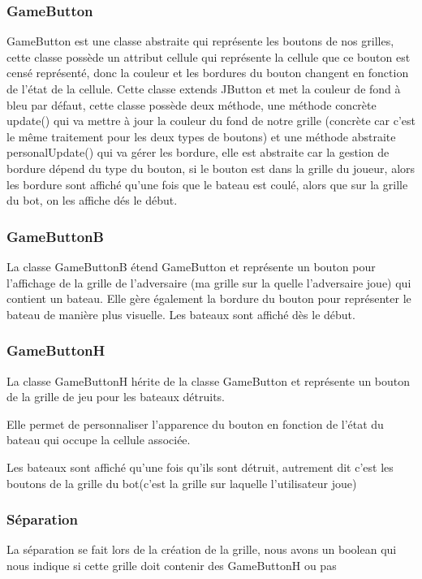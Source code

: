 \documentclass[12pt]{article}
\begin{document}
\subsubsection{GameButton}
GameButton est une classe abstraite qui représente les boutons de nos grilles, cette classe possède un attribut cellule qui représente la cellule que ce bouton est censé représenté, donc la couleur et les bordures du bouton changent en fonction de l'état de la cellule.
Cette classe extends JButton et met la couleur de fond à bleu par défaut, cette classe possède deux méthode, une méthode concrète update() qui va mettre à jour la couleur du fond de notre grille (concrète car c'est le même traitement pour les deux types de boutons) et une méthode abstraite personalUpdate() qui va gérer les bordure, elle est abstraite car la gestion de bordure dépend du type du bouton, si le bouton est dans la grille du joueur, alors les bordure sont affiché qu'une fois que le bateau est coulé, alors que sur la grille du bot, on les affiche dés le début.


\subsubsection{GameButtonB}
 La classe GameButtonB étend GameButton et représente un bouton pour
 l'affichage de la grille de l'adversaire (ma grille sur la quelle
 l'adversaire joue)
  qui contient un bateau. Elle gère également la bordure du bouton pour
 représenter le bateau de manière plus
  visuelle.
 Les bateaux sont affiché dès le début.


\subsubsection{GameButtonH}
  La classe GameButtonH hérite de la classe GameButton et représente un bouton
  de la grille de jeu pour les bateaux détruits.
  
  Elle permet de personnaliser l'apparence du bouton en fonction de l'état du
  bateau qui occupe la cellule associée.
  
  Les bateaux sont affiché qu'une fois qu'ils sont détruit, autrement dit c'est
  les boutons de la grille du bot(c'est la grille sur
  laquelle l'utilisateur joue)
  

\subsubsection{Séparation}

La séparation se fait lors de la création de la grille, nous avons un boolean qui nous indique si cette grille doit contenir des GameButtonH ou pas
\end{document}
